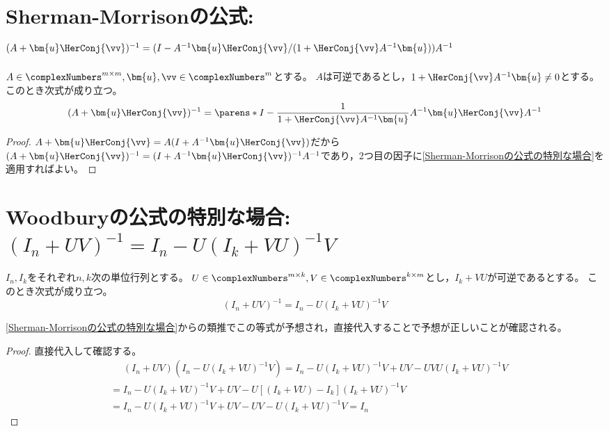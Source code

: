     \section{Sherman-Morrisonの公式\texorpdfstring{: $(A+\bm{u}\HerConj{\vv})^{-1} = (I-A^{-1}\bm{u}\HerConj{\vv}/(1+\HerConj{\vv}A^{-1}\bm{u}))A^{-1}$}{}}
        \begin{shadebox}
            $A \in \complexNumbers^{m\times m}, \bm{u},\vv \in \complexNumbers^m$とする。
            $A$は可逆であるとし，$1+\HerConj{\vv}A^{-1}\bm{u} \neq 0$とする。
            このとき次式が成り立つ。
            \[ (A+\bm{u}\HerConj{\vv})^{-1} = \parens*{ I - \frac{1}{1+\HerConj{\vv}A^{-1}\bm{u}}A^{-1}\bm{u}\HerConj{\vv} }A^{-1} \]
        \end{shadebox}
        \begin{proof}
            $A+\bm{u}\HerConj{\vv} = A(I + A^{-1}\bm{u}\HerConj{\vv})$だから$(A+\bm{u}\HerConj{\vv})^{-1} = (I + A^{-1}\bm{u}\HerConj{\vv})^{-1}A^{-1}$であり，2つ目の因子に\ref{Sherman-Morrisonの公式の特別な場合}を適用すればよい。
        \end{proof}
    \section{Woodburyの公式の特別な場合\texorpdfstring{: $(I_n+UV)^{-1} = I_n-U(I_k+VU)^{-1}V$}{}}
        \label{Woodburyの公式の特別な場合}
        \begin{shadebox}
            $I_n, I_k$をそれぞれ$n,k$次の単位行列とする。
            $U\in\complexNumbers^{m\times k}, V\in\complexNumbers^{k\times m}$とし，$I_k+VU$が可逆であるとする。
            このとき次式が成り立つ。
            \[ (I_n+UV)^{-1} = I_n-U(I_k+VU)^{-1}V \]
        \end{shadebox}
        \ref{Sherman-Morrisonの公式の特別な場合}からの類推でこの等式が予想され，直接代入することで予想が正しいことが確認される。
        \begin{proof}
            直接代入して確認する。
            \begin{align*}
                &\phantom{=} (I_n+UV)(I_n-U(I_k+VU)^{-1}V) = I_n - U(I_k+VU)^{-1}V + UV - UVU(I_k+VU)^{-1}V \\
                &= I_n - U(I_k+VU)^{-1}V + UV - U[(I_k + VU) - I_k](I_k+VU)^{-1}V \\
                &= I_n - U(I_k+VU)^{-1}V + UV - UV - U(I_k+VU)^{-1}V = I_n
            \end{align*}
        \end{proof}

